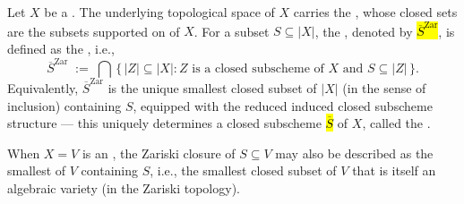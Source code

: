\begin{definition} \label{definition:zariski_closure_of_points_on_a_scheme}
Let $X$ be a . The underlying topological space of $X$ carries the , whose closed sets are the subsets supported on  of $X$. For a subset $S \subseteq |X|$, the , denoted by \hl{$\overline{S}^{\mathrm{Zar}}$}, is defined as the , i.e.,
\[
\overline{S}^{\mathrm{Zar}} \;:=\; \bigcap \, \{ \, |Z| \subseteq |X| : Z \text{ is a closed subscheme of } X \text{ and } S \subseteq |Z| \, \}.
\]
Equivalently, $\overline{S}^{\mathrm{Zar}}$ is the unique smallest closed subset of $|X|$ (in the sense of inclusion) containing $S$, equipped with the reduced induced closed subscheme structure — this uniquely determines a closed subscheme \hl{$\overline{S}$} of $X$, called the .

When $X = V$ is an , the Zariski closure of $S \subseteq V$ may also be described as the smallest  of $V$ containing $S$, i.e., the smallest closed subset of $V$ that is itself an algebraic variety (in the Zariski topology).
\end{definition}
